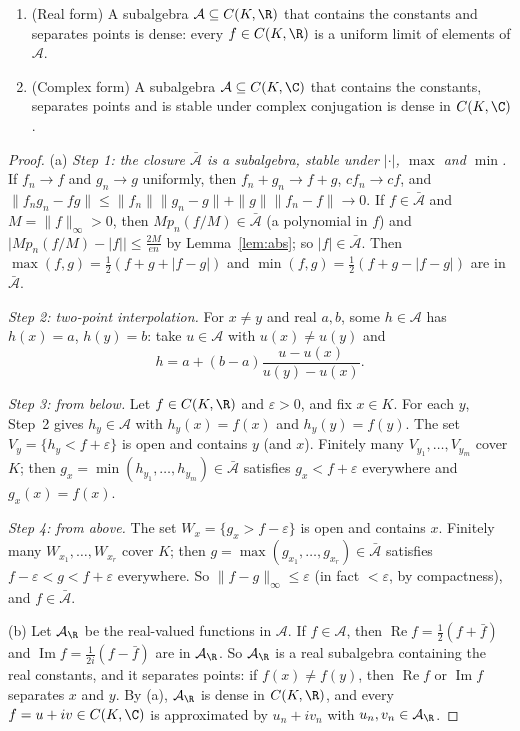 \begin{theorem}\label{thm:sw}
\begin{enumerate}[label=(\alph*)]
\item (Real form) A subalgebra $\mathcal A\subseteq C(K,\R)$ that contains the constants and separates points is dense: every $f\in C(K,\R)$ is a uniform limit of
elements of $\mathcal A$.
\item (Complex form) A subalgebra $\mathcal A\subseteq C(K,\C)$ that contains the constants, separates points and is stable under complex conjugation is
dense in $C(K,\C)$.
\end{enumerate}
\end{theorem}
\begin{proof}
(a) \emph{Step 1: the closure $\bar{\mathcal A}$ is a subalgebra, stable under $|\cdot|$, $\max$ and $\min$.} If $f_n\to f$ and $g_n\to g$ uniformly, then $f_n+g_n\to f+g$, $cf_n\to cf$, and
$\|f_ng_n-fg\|\le\|f_n\|\|g_n-g\|+\|g\|\|f_n-f\|\to0$. If $f\in\bar{\mathcal A}$ and $M=\|f\|_\infty>0$, then $Mp_n(f/M)\in\bar{\mathcal A}$ (a polynomial in $f$) and
$\bigl|Mp_n(f/M)-|f|\bigr|\le\frac{2M}{en}$ by Lemma~\ref{lem:abs}; so $|f|\in\bar{\mathcal A}$. Then $\max(f,g)=\frac12(f+g+|f-g|)$ and $\min(f,g)=\frac12(f+g-|f-g|)$ are in $\bar{\mathcal A}$.

\emph{Step 2: two-point interpolation.} For $x\ne y$ and real $a,b$, some $h\in\mathcal A$ has $h(x)=a$, $h(y)=b$: take $u\in\mathcal A$ with $u(x)\ne u(y)$ and
\[h=a+(b-a)\frac{u-u(x)}{u(y)-u(x)}.\]

\emph{Step 3: from below.} Let $f\in C(K,\R)$ and $\varepsilon>0$, and fix $x\in K$. For each $y$, Step~2 gives $h_y\in\mathcal A$ with $h_y(x)=f(x)$ and $h_y(y)=f(y)$. The set $V_y=\{h_y<f+\varepsilon\}$
is open and contains $y$ (and $x$). Finitely many $V_{y_1},\dots,V_{y_m}$ cover $K$; then $g_x=\min(h_{y_1},\dots,h_{y_m})\in\bar{\mathcal A}$ satisfies $g_x<f+\varepsilon$ everywhere and $g_x(x)=f(x)$.

\emph{Step 4: from above.} The set $W_x=\{g_x>f-\varepsilon\}$ is open and contains $x$. Finitely many $W_{x_1},\dots,W_{x_r}$ cover $K$; then $g=\max(g_{x_1},\dots,g_{x_r})\in\bar{\mathcal A}$
satisfies $f-\varepsilon<g<f+\varepsilon$ everywhere. So $\|f-g\|_\infty\le\varepsilon$ (in fact $<\varepsilon$, by compactness), and $f\in\bar{\mathcal A}$.

(b) Let $\mathcal A_\R$ be the real-valued functions in $\mathcal A$. If $f\in\mathcal A$, then $\operatorname{Re}f=\frac12(f+\bar f)$ and $\operatorname{Im}f=\frac1{2i}(f-\bar f)$ are in $\mathcal A_\R$. So $\mathcal A_\R$ is a real
subalgebra containing the real constants, and it separates points: if $f(x)\ne f(y)$, then $\operatorname{Re}f$ or $\operatorname{Im}f$ separates $x$ and $y$. By (a), $\mathcal A_\R$ is dense in
$C(K,\R)$, and every $f=u+iv\in C(K,\C)$ is approximated by $u_n+iv_n$ with $u_n,v_n\in\mathcal A_\R$.
\end{proof}

